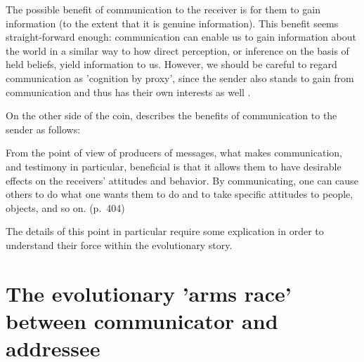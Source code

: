 The possible benefit of communication to the receiver is for them to gain information (to the extent that it is genuine information).
This benefit seems straight-forward enough: communication can enable us to gain information about the world in a similar way to how direct perception, or inference on the basis of held beliefs, yield information to us. However, we should be careful to regard communication as 'cognition by proxy', since the sender also stands to gain from communication and thus has their own interests as well \citep{Sperber01}.

On the other side of the coin, \citet{Sperber01} describes the benefits of communication to the sender as follows:
\begin{quoting}
    From the point of view of producers of messages, what makes communication, and testimony in particular, beneficial is that it allows them to have desirable effects on the receivers' attitudes and behavior. By communicating, one can cause others to do what one wants them to do and to take specific attitudes to people, objects, and so on.
    \hfill (p.~404)
\end{quoting}
The details of this point in particular require some explication in order to understand their force within the evolutionary story.



\section{The evolutionary 'arms race' between communicator and addressee}
\label{sec:arms-race}


